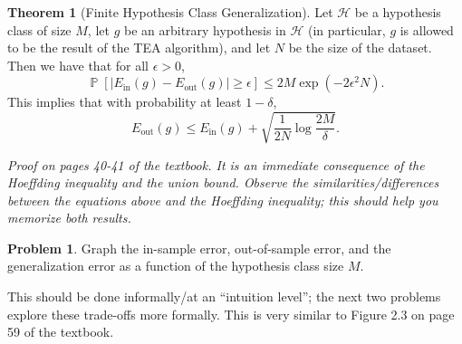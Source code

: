 \documentclass[10pt]{exam}
\theoremstyle{definition}
\newtheorem{problem}{Problem}
\newtheorem{defn}{Definition}
\newtheorem{theorem}{Theorem}
\DeclareMathOperator{\prob}{\mathbb P}
\newcommand{\Ein}{E_{\text{in}}}
\newcommand{\Eout}{E_{\text{out}}}
\begin{document}

\begin{theorem}[Finite Hypothesis Class Generalization]
    Let $\mathcal H$ be a hypothesis class of size $M$,
    let $g$ be an arbitrary hypothesis in $\mathcal H$
    (in particular, $g$ is allowed to be the result of the TEA algorithm),
    and let $N$ be the size of the dataset.
    Then we have that for all $\epsilon>0$,
    \begin{equation*}
    \prob[|\Ein(g) - \Eout(g)| \ge \epsilon] \le 2M\exp(-2\epsilon^2 N).
    \end{equation*}
    This implies that with probability at least $1-\delta$,
    \begin{equation*}
        \Eout(g) \le \Ein(g) + \sqrt{\frac{1}{2N} \log\frac{2M}{\delta}}.
    \end{equation*}
\end{theorem}
\noindent
    \emph{Proof on pages 40-41 of the textbook.  It is an immediate consequence of the Hoeffding inequality and the union bound.  Observe the similarities/differences between the equations above and the Hoeffding inequality; this should help you memorize both results.}

\vspace{3in}
\begin{problem}
    Graph the in-sample error, out-of-sample error, and the generalization error as a function of the hypothesis class size $M$.

    This should be done informally/at an ``intuition level''; the next two problems explore these trade-offs more formally.
    This is very similar to Figure 2.3 on page 59 of the textbook.
\end{problem}
\end{document}
